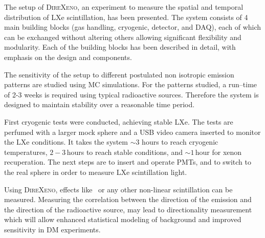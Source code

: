 The setup of \textsc{DireXeno}, an experiment to measure the spatial and temporal distribution of LXe scintillation, has 
been presented. The system consists of 4 main building blocks (gas handling, cryogenic, detector, 
and DAQ), each of which can be exchanged without altering others allowing significant flexibility 
and modularity. Each of the building blocks has been described in detail, with emphasis on the design 
and components.

The sensitivity of the setup to different postulated non isotropic emission patterns are studied using MC simulations. For the patterns studied, a run--time of 2-3 weeks is required using typical radioactive 
sources. Therefore the system is designed to maintain stability over a reasonable time period.

First cryogenic tests were conducted, achieving stable LXe. The tests are perfumed with a larger mock sphere and a USB video camera inserted to monitor the LXe conditions. It takes the system $\sim3$ hours to reach cryogenic temperatures, $2-3$\,hours to reach stable conditions, and $\sim1$\,hour for xenon recuperation. The next steps are to insert and operate PMTs, and to switch to the real sphere in order to measure LXe scintillation light.    

Using \textsc{DireXeno}, effects like \superradiance\ or any other non-linear scintillation can be measured. 
Measuring the correlation between the direction of the emission and the direction of the radioactive 
source, may lead to directionality measurement which will allow enhanced statistical modeling of 
background and improved sensitivity in DM experiments.



